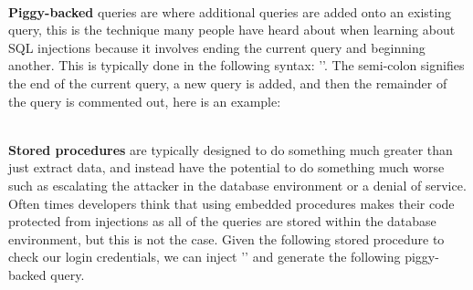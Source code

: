 \noindent
{}
\\

\textbf{Piggy-backed} queries are where additional queries are added onto an existing query, this is the technique many people have heard about when learning about SQL injections because it involves ending the current query and beginning another.  This is typically done in the following syntax: ''.  The semi-colon signifies the end of the current query, a new query is added, and then the remainder of the query is commented out, here is an example:

\noindent
{}
\\

\textbf{Stored procedures} are typically designed to do something much greater than just extract data, and instead have the potential to do something much worse such as escalating the attacker in the database environment or a denial of service.  Often times developers think that using embedded procedures makes their code protected from injections as all of the queries are stored within the database environment, but this is not the case. Given the following stored procedure to check our login credentials, we can inject '' and generate the following piggy-backed query.

\noindent
{}
\\

\noindent
{}

